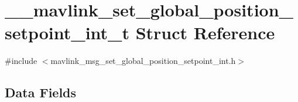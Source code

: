 \hypertarget{struct____mavlink__set__global__position__setpoint__int__t}{\section{\-\_\-\-\_\-mavlink\-\_\-set\-\_\-global\-\_\-position\-\_\-setpoint\-\_\-int\-\_\-t Struct Reference}
\label{struct____mavlink__set__global__position__setpoint__int__t}
}


{\ttfamily \#include $<$mavlink\-\_\-msg\-\_\-set\-\_\-global\-\_\-position\-\_\-setpoint\-\_\-int.\-h$>$}

\subsection*{Data Fields}
